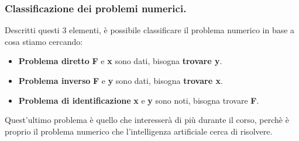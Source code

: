 \documentclass{article}
\begin{document}
\subsubsection{Classificazione dei problemi numerici.} Descritti questi 
%
3 elementi, è possibile classificare il problema numerico in base a 
%
cosa stiamo cercando:
\begin{itemize}
    \item \textbf{Problema diretto} \textbf{F} e \textbf{x} sono dati,
%
    bisogna \textbf{trovare y}.
    \item \textbf{Problema inverso} \textbf{F} e \textbf{y} sono dati,
%
    bisogna \textbf{trovare x}.
    \item \textbf{Problema di identificazione} \textbf{x} e \textbf{y} sono noti,
%
    bisogna trovare \textbf{F}.
\end{itemize}
Quest’ultimo problema è quello che interesserà di più durante il corso, 
%
perchè è proprio il problema numerico che l’intelligenza artificiale
%
cerca di risolvere.

\end{document}
